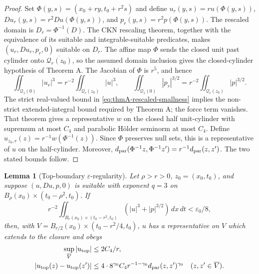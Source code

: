 \documentclass[11pt,letterpaper]{article}
\numberwithin{equation}{section}
\theoremstyle{plain}
\newtheorem{lemma}[theorem]{Lemma}
\theoremstyle{definition}
\theoremstyle{remark}
\begin{document}
\begin{proof}
Set $\Phi(y,s)=(x_0+ry,t_0+r^2s)$ and define
$u_r(y,s)=r u(\Phi(y,s))$, $Du_r(y,s)=r^2Du(\Phi(y,s))$, and
$p_r(y,s)=r^2p(\Phi(y,s))$.  The rescaled domain is
$D_r=\Phi^{-1}(D)$.  The CKN rescaling theorem, together with the
equivalence of its suitable and integrable-suitable predicates, makes
$(u_r,Du_r,p_r,0)$ suitable on $D_r$.  The affine map $\Phi$ sends the
closed unit past cylinder onto $\overline{\mathcal Q_r(z_0)}$, so the
assumed domain inclusion gives the closed-cylinder hypothesis of Theorem A.
The Jacobian of $\Phi$ is $r^5$, and hence
\[
 \iint_{\mathcal Q_1(0)}|u_r|^3
   =r^{-2}\iint_{\mathcal Q_r(z_0)}|u|^3,\qquad
 \iint_{\mathcal Q_1(0)}|p_r|^{3/2}
   =r^{-2}\iint_{\mathcal Q_r(z_0)}|p|^{3/2}.
\]
The strict real-valued bound in \eqref{eq:thmA-rescaled-smallness} implies
the non-strict extended-integral bound required by Theorem A; the force term
vanishes.  That theorem gives a representative $w$ on the closed half
unit-cylinder with supremum at most $C_4$ and parabolic Hölder seminorm at
most $C_4$.  Define
$u_{z_0,r}(z)=r^{-1}w(\Phi^{-1}(z))$.  Since $\Phi$ preserves null sets,
this is a representative of $u$ on the half-cylinder.  Moreover,
$d_{\rm par}(\Phi^{-1}z,\Phi^{-1}z')=r^{-1}d_{\rm par}(z,z')$.
The two stated bounds follow.
\end{proof}


\begin{lemma}[Top-boundary $\varepsilon$-regularity]\label{lem:thmA-top}
Let $\rho>r>0$, $z_0=(x_0,t_0)$, and suppose $(u,Du,p,0)$ is suitable
with exponent $q=3$ on
$B_\rho(x_0)\times(t_0-\rho^2,t_0)$.  If
\begin{equation}\label{eq:thmA-top-smallness}
 r^{-2}\iint_{B_r(x_0)\times(t_0-r^2,t_0)}
       (|u|^3+|p|^{3/2})\,dx\,dt<\varepsilon_0/8,
\end{equation}
then, with $V=B_{r/2}(x_0)\times(t_0-r^2/4,t_0)$, $u$ has a
representative on $V$ which extends to the closure and obeys
\begin{align*}
 \sup_{\overline V}|u_{\rm top}|&\le 2C_4/r,\\
 |u_{\rm top}(z)-u_{\rm top}(z')|
 &\le 4\cdot 8^{\gamma_0}C_4r^{-1-\gamma_0}
          d_{\rm par}(z,z')^{\gamma_0}
 \quad(z,z'\in\overline V).
\end{align*}
\end{lemma}
\end{document}
